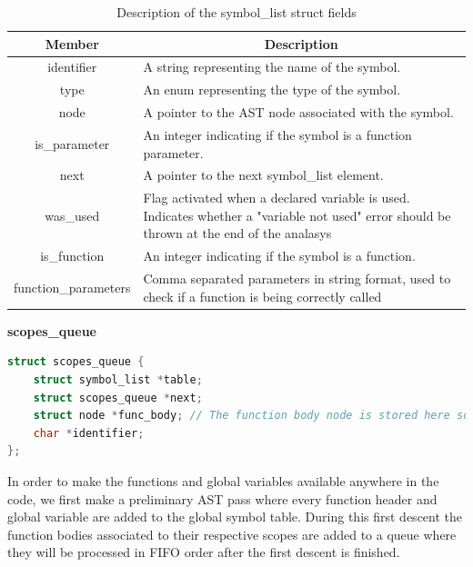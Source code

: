 \documentclass[12pt]{article}
\begin{document}
\begin{itemize}
\begin{center}
\begin{lstlisting}[language=C, basicstyle=\small\ttfamily]
            \end{lstlisting}
        \end{center}
        \begin{table}[h!]
    \centering
    \begin{tabular}{|c|p{10cm}|}
    \hline
    Member & \multicolumn{1}{|c|}{Description} \\
    \hline
    identifier & A string representing the name of the symbol. \\
    \hline
    type & An enum representing the type of the symbol. \\
    \hline
    node & A pointer to the AST node associated with the symbol. \\
    \hline
    is\_parameter & An integer indicating if the symbol is a function parameter. \\
    \hline
    next & A pointer to the next symbol\_list element. \\
    \hline
    was\_used & Flag activated when a declared variable is used. Indicates whether a "variable not used" error should be thrown at the end of the analasys \\
    \hline
    is\_function & An integer indicating if the symbol is a function. \\
    \hline
    function\_parameters & Comma separated parameters in string format, used to check if a function is being correctly called \\
    \hline
    \end{tabular}
    \caption{Description of the symbol\_list struct fields}
    \label{tab:symbol_struct}
\end{table}
\begin{center}
    \textbf{scopes\_queue}
\end{center}
    \begin{center}
            \begin{lstlisting}[language=C, basicstyle=\small\ttfamily]
struct scopes_queue {
    struct symbol_list *table;
    struct scopes_queue *next;
    struct node *func_body; // The function body node is stored here so it can be processed after the function declarations
    char *identifier;
};        
            \end{lstlisting}
        \end{center}
In order to make the functions and global variables available anywhere in the code, we first make a preliminary AST pass where every function header and global variable are added to the global symbol table. During this first descent the function bodies associated to their respective scopes are added to a queue where they will be processed in FIFO order after the first descent is finished.
\end{itemize}
\end{document}
